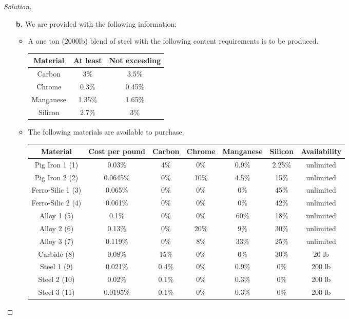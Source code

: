 \documentclass[ 12pt ]{article}
\begin{document}
\begin{enumerate}
\begin{proof}[Solution]
\begin{enumerate}
				\item[\textbf{b.}] We are provided with the following information:
					\begin{itemize}
						\item A one ton (2000lb) blend of steel with the following content requirements is to be produced.
							\begin{center}
							\begin{tabular}{c|cc}
								Material & At least & Not exceeding \\
								\hline
								Carbon & 3\% & 3.5\% \\
								Chrome & 0.3\% & 0.45\% \\
								Manganese & 1.35\% & 1.65\% \\
								Silicon & 2.7\% & 3\%
							\end{tabular}
							\end{center}
						\item The following materials are available to purchase.
							\begin{center}
							\begin{tabular}{c|cccccc}
								Material & Cost per pound & Carbon & Chrome & Manganese & Silicon & Availability \\
								\hline
								Pig Iron 1 (1)    & 0.03\%   & 4\%   & 0\%  & 0.9\% & 2.25\% & unlimited \\
								Pig Iron 2 (2)    & 0.0645\% & 0\%   & 10\% & 4.5\% & 15\% & unlimited \\
								Ferro-Silic 1 (3) & 0.065\%  & 0\%   & 0\%  & 0\%   & 45\% & unlimited \\
								Ferro-Silic 2 (4) & 0.061\%  & 0\%   & 0\%  & 0\%   & 42\% & unlimited \\
								Alloy 1 (5)       & 0.1\%    & 0\%   & 0\%  & 60\%  & 18\% & unlimited \\
								Alloy 2 (6)       & 0.13\%   & 0\%   & 20\% & 9\%   & 30\% & unlimited \\
								Alloy 3 (7)       & 0.119\%  & 0\%   & 8\%  & 33\%  & 25\% & unlimited \\
								Carbide (8)       & 0.08\%   & 15\%  & 0\%  & 0\%   & 30\% & 20 lb \\
								Steel 1 (9)       & 0.021\%  & 0.4\% & 0\%  & 0.9\% & 0\% & 200 lb \\
								Steel 2 (10)      & 0.02\%   & 0.1\% & 0\%  & 0.3\% & 0\% & 200 lb \\
								Steel 3 (11)      & 0.0195\% & 0.1\% & 0\%  & 0.3\% & 0\% & 200 lb
							\end{tabular}

\end{center}
\end{itemize}
\end{enumerate}
\end{proof}
\end{enumerate}
\end{document}
